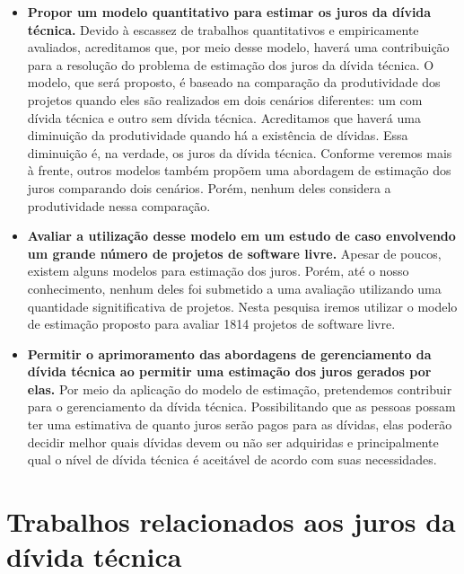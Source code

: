 \begin{itemize}
\item  \textbf{Propor um modelo quantitativo para estimar os juros da dívida técnica.} Devido à escassez de trabalhos quantitativos e empiricamente avaliados, acreditamos que, por meio desse modelo, haverá uma contribuição para a resolução do problema de estimação dos juros da dívida técnica. O modelo, que será proposto, é baseado na comparação da produtividade dos projetos quando eles são realizados em dois cenários diferentes: um com dívida técnica e outro sem dívida técnica. Acreditamos que haverá uma diminuição da produtividade quando há a existência de dívidas. Essa diminuição é, na verdade, os juros da dívida técnica. Conforme veremos mais à frente, outros modelos também propõem uma abordagem de estimação dos juros comparando dois cenários. Porém, nenhum deles considera a produtividade nessa comparação. 
\item  \textbf{Avaliar a utilização desse modelo em um estudo de caso envolvendo um grande número de projetos de software livre.} Apesar de poucos, existem alguns modelos para estimação dos juros. Porém, até o nosso conhecimento, nenhum deles foi submetido a uma avaliação utilizando uma quantidade signitificativa de projetos. Nesta pesquisa iremos utilizar o modelo de estimação proposto para avaliar 1814 projetos de software livre.
\item  \textbf{Permitir o aprimoramento das abordagens de gerenciamento da dívida técnica ao permitir uma estimação dos juros gerados por elas.} Por meio da aplicação do modelo de estimação, pretendemos contribuir para o gerenciamento da dívida técnica. Possibilitando que as pessoas possam ter uma estimativa de quanto juros serão pagos para as dívidas, elas poderão decidir melhor quais dívidas devem ou não ser adquiridas e principalmente qual o nível de dívida técnica é aceitável de acordo com suas necessidades. 
\end{itemize}



\section{Trabalhos relacionados aos juros da dívida técnica}
\label{modelos_existentes}


